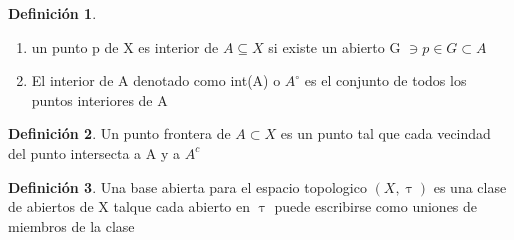 \documentclass{article}
\theoremstyle{definition}
\newtheorem{definition}{Definición}[section]
\begin{document}
\begin{definition}
\hfill
	\begin{enumerate}
		\item un punto p de X es interior de $A\subseteq X$ si existe un abierto G $\ni p\in G\subset A$
		\item El interior de A denotado como int(A) o $A^{\circ}$ es el conjunto de todos los puntos interiores de A
	\end{enumerate}
\end{definition}
\begin{definition}
	Un punto frontera de $A\subset X$ es un punto tal que cada vecindad del punto intersecta a A y a $A^c$
\end{definition}
\begin{definition}
	Una base abierta para el espacio topologico $(X,\uptau)$ es una clase de abiertos de X talque cada abierto en $\uptau$ puede escribirse como uniones de miembros de la clase
\end{definition}
\end{document}
